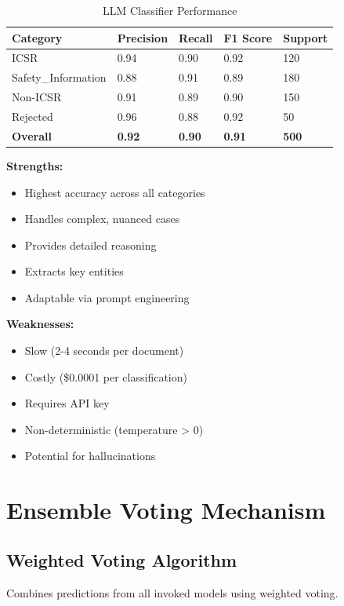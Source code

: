 \begin{table}[h]
\centering
\caption{LLM Classifier Performance}
\begin{tabularx}{\textwidth}{lXXXX}
\toprule
\textbf{Category} & \textbf{Precision} & \textbf{Recall} & \textbf{F1 Score} & \textbf{Support} \\
\midrule
ICSR & 0.94 & 0.90 & 0.92 & 120 \\
Safety\_Information & 0.88 & 0.91 & 0.89 & 180 \\
Non-ICSR & 0.91 & 0.89 & 0.90 & 150 \\
Rejected & 0.96 & 0.88 & 0.92 & 50 \\
\textbf{Overall} & \textbf{0.92} & \textbf{0.90} & \textbf{0.91} & \textbf{500} \\
\bottomrule
\end{tabularx}
\end{table}

\textbf{Strengths:}
\begin{itemize}
    \item Highest accuracy across all categories
    \item Handles complex, nuanced cases
    \item Provides detailed reasoning
    \item Extracts key entities
    \item Adaptable via prompt engineering
\end{itemize}

\textbf{Weaknesses:}
\begin{itemize}
    \item Slow (2-4 seconds per document)
    \item Costly (\$0.0001 per classification)
    \item Requires API key
    \item Non-deterministic (temperature > 0)
    \item Potential for hallucinations
\end{itemize}

\section{Ensemble Voting Mechanism}

\subsection{Weighted Voting Algorithm}

Combines predictions from all invoked models using weighted voting.

